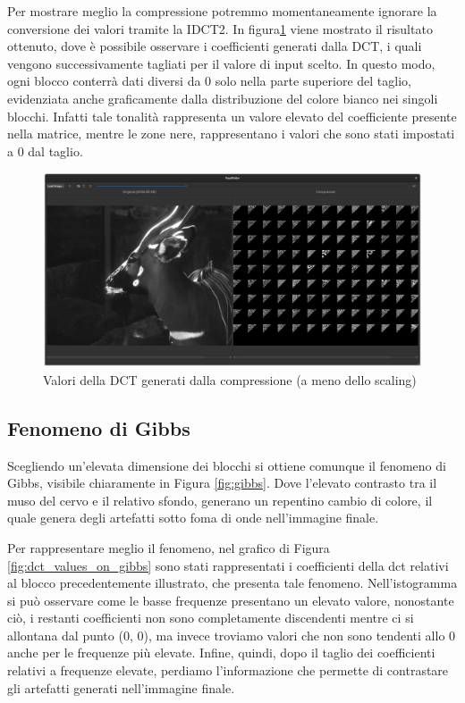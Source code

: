 Per mostrare meglio la compressione potremmo momentaneamente ignorare la conversione dei valori tramite la IDCT2. In figura\ref{fig:compression_values} viene mostrato il risultato ottenuto, dove è possibile osservare i coefficienti generati dalla DCT, i quali vengono successivamente tagliati per il valore di input scelto. In questo modo, ogni blocco conterrà dati diversi da 0 solo nella parte superiore del taglio, evidenziata anche graficamente dalla distribuzione del colore bianco nei singoli blocchi. Infatti tale tonalità rappresenta un valore elevato del coefficiente presente nella matrice, mentre le zone nere, rappresentano i valori che sono stati impostati a 0 dal taglio.

\begin{figure}[h]
	\centering
	\includegraphics[width=1\linewidth]{figures/qt_dct_values}
	\caption{Valori della DCT generati dalla compressione (a meno dello scaling)}
	\label{fig:compression_values}
\end{figure}

\subsection{Fenomeno di Gibbs}

Scegliendo un'elevata dimensione dei blocchi si ottiene comunque il fenomeno di Gibbs, visibile chiaramente in Figura \ref{fig:gibbs}. Dove l'elevato contrasto tra il muso del cervo e il relativo sfondo, generano un repentino cambio di colore, il quale genera degli artefatti sotto foma di onde nell'immagine finale.

Per rappresentare meglio il fenomeno, nel grafico di Figura \ref{fig:dct_values_on_gibbs} sono stati rappresentati i coefficienti della dct relativi al blocco precedentemente illustrato, che presenta tale fenomeno. Nell'istogramma si può osservare come le basse frequenze presentano un elevato valore, nonostante ciò, i restanti coefficienti non sono completamente discendenti mentre ci si allontana dal punto (0, 0), ma invece troviamo valori che non sono tendenti allo 0 anche per le frequenze più elevate. Infine, quindi, dopo il taglio dei coefficienti relativi a frequenze elevate, perdiamo l'informazione che permette di contrastare gli artefatti generati nell'immagine finale.

